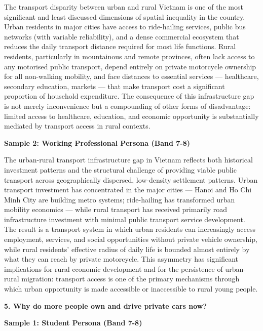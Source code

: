 The transport disparity between urban and rural Vietnam is one of the most significant and least discussed dimensions of spatial inequality in the country. Urban residents in major cities have access to ride-hailing services, public bus networks (with variable reliability), and a dense commercial ecosystem that reduces the daily transport distance required for most life functions. Rural residents, particularly in mountainous and remote provinces, often lack access to any motorised public transport, depend entirely on private motorcycle ownership for all non-walking mobility, and face distances to essential services — healthcare, secondary education, markets — that make transport cost a significant proportion of household expenditure. The consequence of this infrastructure gap is not merely inconvenience but a compounding of other forms of disadvantage: limited access to healthcare, education, and economic opportunity is substantially mediated by transport access in rural contexts.

\textbf{Sample 2: Working Professional Persona (Band 7-8)}

The urban-rural transport infrastructure gap in Vietnam reflects both historical investment patterns and the structural challenge of providing viable public transport across geographically dispersed, low-density settlement patterns. Urban transport investment has concentrated in the major cities — Hanoi and Ho Chi Minh City are building metro systems; ride-hailing has transformed urban mobility economics — while rural transport has received primarily road infrastructure investment with minimal public transport service development. The result is a transport system in which urban residents can increasingly access employment, services, and social opportunities without private vehicle ownership, while rural residents' effective radius of daily life is bounded almost entirely by what they can reach by private motorcycle. This asymmetry has significant implications for rural economic development and for the persistence of urban-rural migration: transport access is one of the primary mechanisms through which urban opportunity is made accessible or inaccessible to rural young people.

\separator

\begin{ieltsquestion}
\textbf{5. Why do more people own and drive private cars now?}
\end{ieltsquestion}
\textbf{Sample 1: Student Persona (Band 7-8)}

